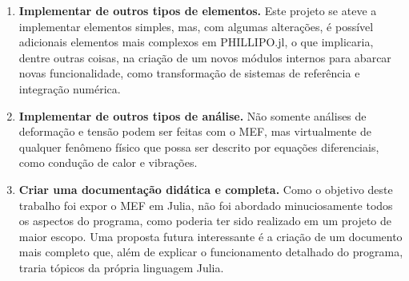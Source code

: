 \begin{enumerate}
    \item \textbf{Implementar de outros tipos de elementos.} Este projeto se ateve a implementar elementos simples, mas, com algumas alterações, é possível adicionais elementos mais complexos em PHILLIPO.jl, o que implicaria, dentre outras coisas, na criação de um novos módulos internos para abarcar novas funcionalidade, como transformação de sistemas de referência e integração numérica.
    \item \textbf{Implementar de outros tipos de análise.} Não somente análises de deformação e tensão podem ser feitas com o MEF, mas virtualmente de qualquer fenômeno físico que possa ser descrito por equações diferenciais, como condução de calor e vibrações.
    \item \textbf{Criar uma documentação didática e completa.} Como o objetivo deste trabalho foi expor o MEF em Julia, não foi abordado minuciosamente todos os aspectos do programa, como poderia ter sido realizado em um projeto de maior escopo. Uma proposta futura interessante é a criação de um documento mais completo que, além de explicar o funcionamento detalhado do programa, traria tópicos da própria linguagem Julia.
\end{enumerate}

